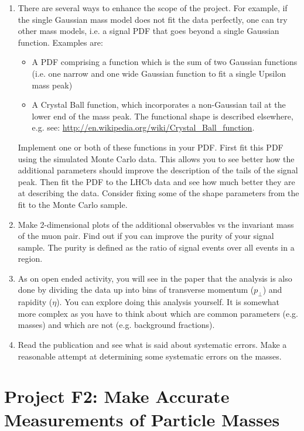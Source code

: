 \begin{enumerate}
\item There are several ways to enhance the scope of the project.
For example, if the single Gaussian mass model does not fit the data perfectly, one can try other mass models, i.e. a signal PDF that goes beyond a single Gaussian function.
Examples are:
\begin{itemize}
\item A PDF comprising a function which is the sum of two Gaussian functions (i.e. one narrow and one wide Gaussian function to fit a single Upsilon mass peak)
\item A Crystal Ball function, which incorporates a non-Gaussian tail at the lower end of the mass peak.
The functional shape is described elsewhere, e.g. see: \url{http://en.wikipedia.org/wiki/Crystal_Ball_function}. 
\end{itemize}
Implement one or both of these functions in your PDF. 
First fit this PDF using the simulated Monte Carlo data.
This allows you to see better how the additional parameters should improve the description of the tails of the signal peak.
Then fit the PDF to the LHCb data and see how much better they are at describing the data.
Consider fixing some of the shape parameters from the fit to the Monte Carlo sample.

\item Make 2-dimensional plots of the additional observables vs the invariant mass of the muon pair.
Find out if you can improve the purity of your signal sample.
The purity is defined as the ratio of signal events over all events in a region.

\item As on open ended activity, you will see in the paper that the analysis is also done by dividing the data up into bins of transverse momentum ($p_\perp$) and rapidity ($\eta$).
You can explore doing this analysis yourself.
It is somewhat more complex as you have to think about which are common parameters (e.g. masses) and which are not (e.g. background fractions).

\item Read the publication and see what is said about systematic errors.  Make a reasonable attempt at determining some systematic errors on the masses.


\end{enumerate}

 
 
 

\newpage
\section{Project F2: Make Accurate Measurements of Particle Masses}

